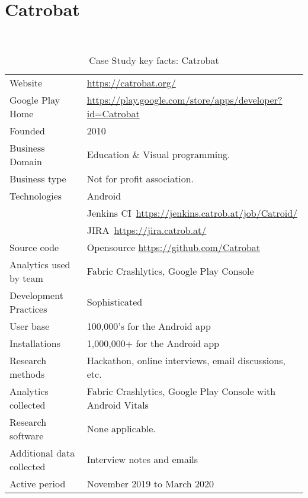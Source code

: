 \clearpage


\section{Catrobat}~\label{case-study-overview-catrobat}

{\renewcommand{\arraystretch}{0.8}%
\begin{table}[htbp!]
    \centering
    \small
    \setlength{\tabcolsep}{1pt}
    \begin{tabular}{lp{11cm}}
       \toprule
       Website &\url{https://catrobat.org/} \\
       Google Play Home & \url{https://play.google.com/store/apps/developer?id=Catrobat} \\
       Founded & 2010 \\
       Business Domain & Education \& Visual programming. \\
       Business type & Not for profit association. \\
       Technologies  & Android \\
       & Jenkins CI~\url{https://jenkins.catrob.at/job/Catroid/}  \\
       & JIRA~\url{https://jira.catrob.at/} \\
       Source code  & Opensource \url{https://github.com/Catrobat} \\
       Analytics used by team & Fabric Crashlytics, Google Play Console \\
       Development Practices & Sophisticated~\footnotemark \\
       \midrule
       User base & 100,000's for the Android app \\
       Installations & 1,000,000+ for the Android app \\
       \midrule
       Research methods &Hackathon, online interviews, email discussions, etc. \\
       Analytics collected &Fabric Crashlytics, Google Play Console with Android Vitals \\
       Research software & None applicable. \\
       Additional data collected &Interview notes and emails \\
       Active period & November 2019 to March 2020 \\
       \bottomrule
    \end{tabular}
    \caption{Case Study key facts: Catrobat}
    \label{tab:blank_case_study_anaytics_overview}
\end{table}
}

